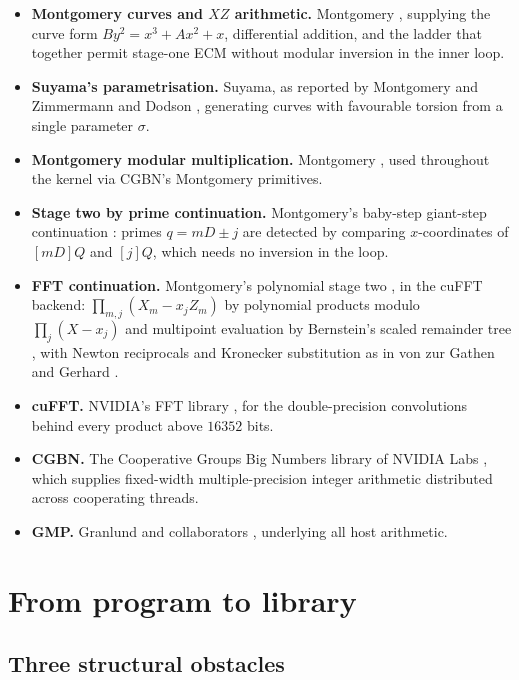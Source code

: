 \documentclass[11pt,a4paper]{article}
\begin{document}
\begin{itemize}
  \item \textbf{Montgomery curves and $XZ$ arithmetic.} Montgomery
    \cite{montgomery1987}, supplying the curve form
    $By^2 = x^3 + Ax^2 + x$, differential addition, and the ladder that
    together permit stage-one ECM without modular inversion in the inner
    loop.
  \item \textbf{Suyama's parametrisation.} Suyama, as reported by
    Montgomery \cite{montgomery1987} and Zimmermann and Dodson
    \cite{zimmermann2006}, generating curves with favourable torsion from
    a single parameter $\sigma$.
  \item \textbf{Montgomery modular multiplication.} Montgomery
    \cite{montgomery1985}, used throughout the kernel via CGBN's
    Montgomery primitives.
  \item \textbf{Stage two by prime continuation.} Montgomery's baby-step
    giant-step continuation \cite{montgomery1987}: primes $q = mD \pm j$ are
    detected by comparing $x$-coordinates of $[mD]Q$ and $[j]Q$, which needs no
    inversion in the loop.
  \item \textbf{FFT continuation.} Montgomery's polynomial stage two
    \cite{montgomery1992}, in the cuFFT backend: $\prod_{m,j} (X_m - x_j Z_m)$
    by polynomial products modulo $\prod_j (X - x_j)$ and multipoint
    evaluation by Bernstein's scaled remainder tree \cite{bernstein2004},
    with Newton reciprocals and Kronecker substitution as in von zur
    Gathen and Gerhard \cite{vzgathen2013}.
  \item \textbf{cuFFT.} NVIDIA's FFT library \cite{cufft}, for the
    double-precision convolutions behind every product above $16352$ bits.
  \item \textbf{CGBN.} The Cooperative Groups Big Numbers library of
    NVIDIA Labs \cite{cgbn}, which supplies fixed-width multiple-precision
    integer arithmetic distributed across cooperating threads.
  \item \textbf{GMP.} Granlund and collaborators \cite{gmp}, underlying
    all host arithmetic.
\end{itemize}

\section{From program to library}

\subsection{Three structural obstacles}
\end{document}
